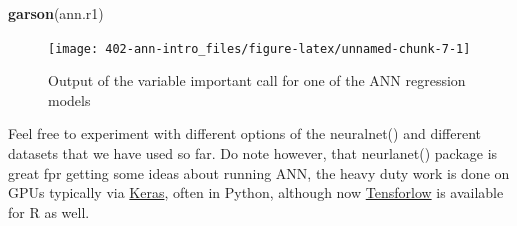 \documentclass[
]{book}
\newenvironment{Shaded}{\begin{snugshade}}{\end{snugshade}}
\newcommand{\KeywordTok}[1]{\textcolor[rgb]{0.13,0.29,0.53}{\textbf{#1}}}
\newcommand{\NormalTok}[1]{#1}
\theoremstyle{definition}
\theoremstyle{definition}
\theoremstyle{definition}
\theoremstyle{remark}
\begin{document}
\begin{Shaded}
\begin{Highlighting}[]
\KeywordTok{garson}\NormalTok{(ann.r1)}
\end{Highlighting}
\end{Shaded}

\begin{figure}

{\centering \texttt{[image: 402-ann-intro\_files/figure-latex/unnamed-chunk-7-1]} 

}

\caption{Output of the variable important call for one of the ANN regression models}\label{fig:unnamed-chunk-7}
\end{figure}

Feel free to experiment with different options of the neuralnet() and different datasets that we have used so far. Do note however, that neurlanet() package is great fpr getting some ideas about running ANN, the heavy duty work is done on GPUs typically via \href{https://tensorflow.rstudio.com/guide/keras/}{Keras}, often in Python, although now \href{https://tensorflow.rstudio.com}{Tensforlow} is available for R as well.
\end{document}
